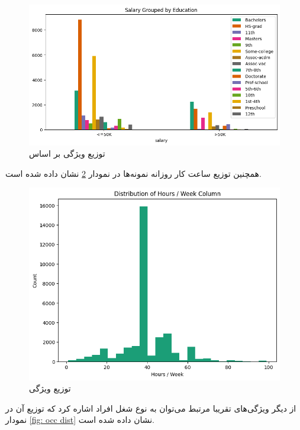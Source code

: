 \documentclass{article}
\begin{document}
	\begin{figure}[H]
		\centering
		\includegraphics[scale=0.5]{figs/salary_by_edu}
		\caption{
			توزیع ویژگی 
			بر اساس
		}
		\label{fig: salary by education dist}
	\end{figure}
	همچنین توزیع ساعت کار روزانه نمونه‌ها در نمودار 
	\ref{fig: hours dist}
	نشان داده شده است.\\
	\begin{figure}[H]
		\centering
		\includegraphics[scale=0.5]{figs/hours_dist}
		\caption{
			توزیع ویژگی 
		}
		\label{fig: hours dist}
	\end{figure}
	از دیگر ویژگی‌های تقریبا مرتبط می‌توان به نوع شغل افراد اشاره کرد که توزیع آن در نمودار 
	\ref{fig: occ dist}
	نشان داده شده است.\\
\end{document}
